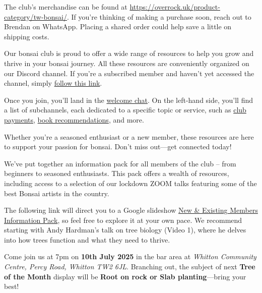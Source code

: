 \label{2025-06-news}
\noindent
The club's merchandise can be found at \url{https://overrock.uk/product-category/tw-bonsai/}.
If you're thinking of making a purchase soon, reach out to Brendan on WhatsApp.
Placing a shared order could help save a little on shipping costs.

\medskip
{}
\noindent  
Our bonsai club is proud to offer a wide range of resources to help you grow and thrive in your bonsai journey.
All these resources are conveniently organized on our Discord channel.
If you're a subscribed member and haven’t yet accessed the channel, simply \href{https://discord.gg/N6yka6XJ}{follow this link}.

Once you join, you'll land in the \href{https://discord.com/channels/873817545013071872/1118677826208550923}{welcome chat}.
On the left\--hand side, you'll find a list of subchannels, each dedicated to a specific topic or service, such as \href{https://discord.com/channels/873817545013071872/1039691122148130876}{club payments}, \href{https://discord.com/channels/873817545013071872/1001189937409949698}{book recommendations}, and more.

Whether you're a seasoned enthusiast or a new member, these resources are here to support your passion for bonsai.
Don't miss out---get connected today!

\medskip	
{}
\noindent
We've put together an information pack for all members of the club – from beginners to seasoned enthusiasts.
This pack offers a wealth of resources, including access to a selection of our lockdown ZOOM talks featuring some of the best Bonsai artists in the country.

The following link will direct you to a Google slideshow \href{https://docs.google.com/presentation/d/1L5SRA_ZSvnGMLbRt0CSf-Uz7BaiOfxOs7OUHMM_XrTY/edit?usp=sharing}{New \& Existing Members Information Pack}, so feel free to explore it at your own pace.
We recommend starting with Andy Hardman’s talk on tree biology (Video 1), where he delves into how trees function and what they need to thrive.

\medskip
{}
\noindent
Come join us at 7pm on \textbf{10th July 2025} in the bar area at \emph{Whitton Community Centre, Percy Road, Whitton TW2 6JL}.
Branching out, the subject of next \textbf{Tree of the Month} display will be \textbf{Root on rock or Slab planting}---bring your best!
\closearticle
\columnbreak
